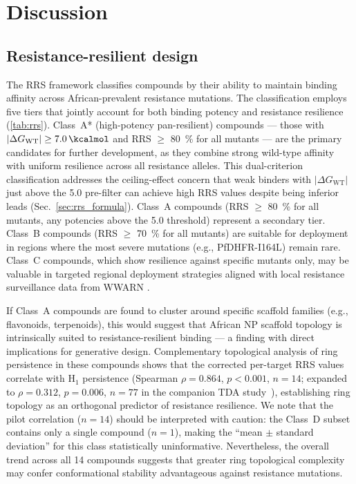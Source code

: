 \documentclass[11pt,a4paper]{article}
\begin{document}

\section{Discussion}

\subsection{Resistance-resilient design}

The RRS framework classifies compounds by their ability to maintain binding affinity across African-prevalent resistance mutations. The classification employs five tiers that jointly account for both binding potency and resistance resilience (\cref{tab:rrs}). Class~A* (high-potency pan-resilient) compounds --- those with $|\Delta G_{\mathrm{WT}}| \geq \SI{7.0}{\kcalmol}$ and RRS $\geq$ \qty{80}{\percent} for all mutants --- are the primary candidates for further development, as they combine strong wild-type affinity with uniform resilience across all resistance alleles. This dual-criterion classification addresses the ceiling-effect concern that weak binders with $|\Delta G_{\mathrm{WT}}|$ just above the \SI{5.0}{\kcalmol} pre-filter can achieve high RRS values despite being inferior leads (Sec.~\cref{sec:rrs_formula}). Class~A compounds (RRS $\geq$ \qty{80}{\percent} for all mutants, any potencies above the \SI{5.0}{\kcalmol} threshold) represent a secondary tier. Class~B compounds (RRS $\geq$ \qty{70}{\percent} for all mutants) are suitable for deployment in regions where the most severe mutations (e.g., PfDHFR-I164L) remain rare. Class~C compounds, which show resilience against specific mutants only, may be valuable in targeted regional deployment strategies aligned with local resistance surveillance data from WWARN \citep{wwarn_2026}.

If Class~A compounds are found to cluster around specific scaffold families (e.g., flavonoids, terpenoids), this would suggest that African NP scaffold topology is intrinsically suited to resistance-resilient binding --- a finding with direct implications for generative design. Complementary topological analysis of ring persistence in these compounds shows that the corrected per-target RRS values correlate with H$_1$ persistence (Spearman $\rho = 0.864$, $p < 0.001$, $n = 14$; expanded to $\rho = 0.312$, $p = 0.006$, $n = 77$ in the companion TDA study~\citep{temgoua2026quantum}), establishing ring topology as an orthogonal predictor of resistance resilience. We note that the pilot correlation ($n = 14$) should be interpreted with caution: the Class~D subset contains only a single compound ($n = 1$), making the ``mean $\pm$ standard deviation'' for this class statistically uninformative. Nevertheless, the overall trend across all 14 compounds suggests that greater ring topological complexity may confer conformational stability advantageous against resistance mutations.
\end{document}
